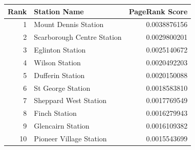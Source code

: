 \begin{tabular}{r l r}
\toprule
Rank & Station Name & PageRank Score \\
\midrule
1 & Mount Dennis Station & 0.0038876156 \\
2 & Scarborough Centre Station & 0.0029800201 \\
3 & Eglinton Station & 0.0025140672 \\
4 & Wilson Station & 0.0020492203 \\
5 & Dufferin Station & 0.0020150088 \\
6 & St George Station & 0.0018583810 \\
7 & Sheppard West Station & 0.0017769549 \\
8 & Finch Station & 0.0016279943 \\
9 & Glencairn Station & 0.0016109382 \\
10 & Pioneer Village Station & 0.0015543699 \\
\bottomrule
\end{tabular}
